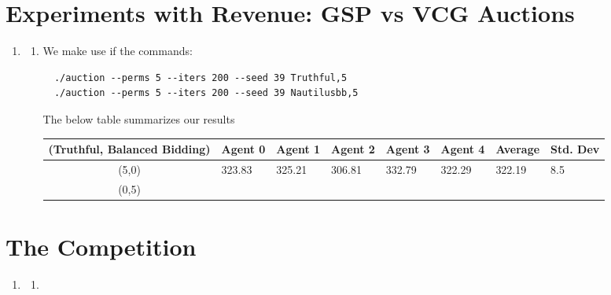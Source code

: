 \documentclass[11pt]{article}
\begin{document}
\section*{Experiments with Revenue: GSP vs VCG Auctions}
\begin{enumerate}[resume]
\item 
  \begin{enumerate}
  \item We make use if the commands:
  \begin{lstlisting}
  ./auction --perms 5 --iters 200 --seed 39 Truthful,5
  ./auction --perms 5 --iters 200 --seed 39 Nautilusbb,5
  \end{lstlisting}
  The below table summarizes our results
  
    \begin{table}[h]
\begin{tabular}{clllllll}
\hline
(Truthful, Balanced Bidding) & Agent 0                     & Agent 1                     & Agent 2                     & Agent 3                     & Agent 4                     & Average                     & Std. Dev                 \\ \hline
\multicolumn{1}{|c|}{(5,0)}  & \multicolumn{1}{l|}{323.83} & \multicolumn{1}{l|}{325.21} & \multicolumn{1}{l|}{306.81} & \multicolumn{1}{l|}{332.79} & \multicolumn{1}{l|}{322.29} & \multicolumn{1}{l|}{322.19} & \multicolumn{1}{l|}{8.5} \\ \hline
(0,5)                        &                             &                             &                             &                             &                             &                             &                          \\ \hline
\end{tabular}
\end{table}
  \end{enumerate}
\end{enumerate}

\section*{The Competition}
\begin{enumerate}[resume]
\item
  \begin{enumerate}
  \item 
  \end{enumerate}
\end{enumerate}
\end{document}
